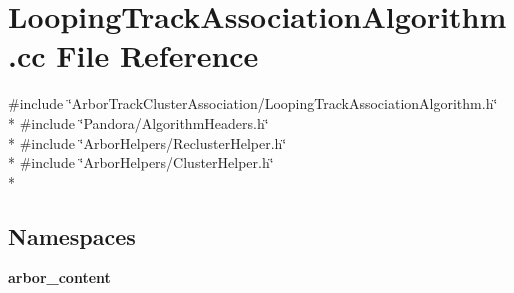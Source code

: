 \section{Looping\+Track\+Association\+Algorithm.\+cc File Reference}
\label{LoopingTrackAssociationAlgorithm_8cc}
{\ttfamily \#include \char`\"{}Arbor\+Track\+Cluster\+Association/\+Looping\+Track\+Association\+Algorithm.\+h\char`\"{}}\\*
{\ttfamily \#include \char`\"{}Pandora/\+Algorithm\+Headers.\+h\char`\"{}}\\*
{\ttfamily \#include \char`\"{}Arbor\+Helpers/\+Recluster\+Helper.\+h\char`\"{}}\\*
{\ttfamily \#include \char`\"{}Arbor\+Helpers/\+Cluster\+Helper.\+h\char`\"{}}\\*
\subsection*{Namespaces}
\begin{DoxyCompactItemize}
\item 
 {\bf arbor\+\_\+content}
\end{DoxyCompactItemize}
